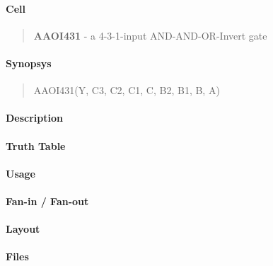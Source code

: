 \label{AAOI431}
\paragraph{Cell}
\begin{quote}
    \textbf{AAOI431} - a 4-3-1-input AND-AND-OR-Invert gate
\end{quote}

\paragraph{Synopsys}
\begin{quote}
    AAOI431(Y, C3, C2, C1, C, B2, B1, B, A)
\end{quote}

\paragraph{Description}

%

\paragraph{Truth Table}
%

\paragraph{Usage}

\paragraph{Fan-in / Fan-out}

\paragraph{Layout}

\paragraph{Files}
